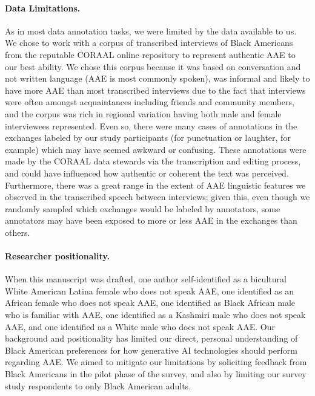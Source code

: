 \paragraph{Data Limitations.} As in most data annotation tasks, we were limited by the data available to us. We chose to work with a corpus of transcribed interviews of Black Americans from the reputable CORAAL online repository to represent authentic AAE to our best ability. We chose this corpus because it was based on conversation and not written language (AAE is most commonly spoken), was informal and likely to have more AAE than most transcribed interviews due to the fact that interviews were often amongst acquaintances including friends and community members, and the corpus was rich in  regional variation having both male and female interviewees represented. Even so, there were many cases of annotations in the exchanges labeled by our study participants (for punctuation or laughter, for example) which may have seemed awkward or confusing. These annotations were made by the CORAAL data stewards via the transcription and editing process, and could have influenced how authentic or coherent the text was perceived. Furthermore, there was a great range in the extent of AAE linguistic features we observed in the transcribed speech between interviews; given this, even though we randomly sampled which exchanges would be labeled by annotators, some annotators may have been exposed to more or less AAE in the exchanges than others.

\paragraph{Researcher positionality.} 
When this manuscript was drafted, one author self-identified as a bicultural White American Latina female who does not speak AAE,
one identified as an African female who does not speak AAE,
one identified as Black African male who is familiar with AAE,
one identified as a Kashmiri male who does not speak AAE,
and one identified as a White male who does not speak AAE. 
Our background and positionality has limited our direct, personal understanding of Black American preferences for how generative AI technologies should perform regarding AAE. We aimed to mitigate our limitations by soliciting feedback from Black Americans in the pilot phase of the survey, and also by limiting our survey study respondents to only Black American adults.


